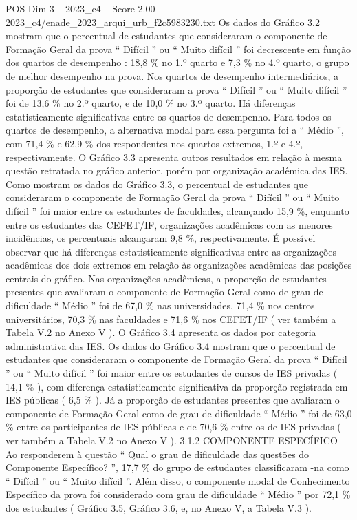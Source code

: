 \begin{textsample}{POS Dim 3 – 2023\_c4 – Score 2.00 – 2023\_c4/enade\_2023\_arqui\_urb\_f2c5983230.txt}
Os dados do Gráfico 3.2 mostram que o percentual de estudantes que consideraram o componente de Formação Geral da prova “ Difícil ” ou “ Muito difícil ” foi decrescente em função dos quartos de desempenho : 18,8 \% no 1.º quarto e 7,3 \% no 4.º quarto, o grupo de melhor desempenho na prova.
Nos quartos de desempenho intermediários, a proporção de estudantes que consideraram a prova “ Difícil ” ou “ Muito difícil ” foi de 13,6 \% no 2.º quarto, e de 10,0 \% no 3.º quarto.
Há diferenças estatisticamente significativas entre os quartos de desempenho.
Para todos os quartos de desempenho, a alternativa modal para essa pergunta foi a “ Médio ”, com 71,4 \% e 62,9 \% dos respondentes nos quartos extremos, 1.º e 4.º, respectivamente.
O Gráfico 3.3 apresenta outros resultados em relação à mesma questão retratada no gráfico anterior, porém por organização acadêmica das IES.
Como mostram os dados do Gráfico 3.3, o percentual de estudantes que consideraram o componente de Formação Geral da prova “ Difícil ” ou “ Muito difícil ” foi maior entre os estudantes de faculdades, alcançando 15,9 \%, enquanto entre os estudantes das CEFET/IF, organizações acadêmicas com as menores incidências, os percentuais alcançaram 9,8 \%, respectivamente.
É possível observar que há diferenças estatisticamente significativas entre as organizações acadêmicas dos dois extremos em relação às organizações acadêmicas das posições centrais do gráfico.
Nas organizações acadêmicas, a proporção de estudantes presentes que avaliaram o componente de Formação Geral como de grau de dificuldade “ Médio ” foi de 67,0 \% nas universidades, 71,4 \% nos centros universitários, 70,3 \% nas faculdades e 71,6 \% nos CEFET/IF ( ver também a Tabela V.2 no Anexo V ).
O Gráfico 3.4 apresenta os dados por categoria administrativa das IES.
Os dados do Gráfico 3.4 mostram que o percentual de estudantes que consideraram o componente de Formação Geral da prova “ Difícil ” ou “ Muito difícil ” foi maior entre os estudantes de cursos de IES privadas ( 14,1 \% ), com diferença estatisticamente significativa da proporção registrada em IES públicas ( 6,5 \% ).
Já a proporção de estudantes presentes que avaliaram o componente de Formação Geral como de grau de dificuldade “ Médio ” foi de 63,0 \% entre os participantes de IES públicas e de 70,6 \% entre os de IES privadas ( ver também a Tabela V.2 no Anexo V ). 3.1.2 COMPONENTE ESPECÍFICO Ao responderem à questão “ Qual o grau de dificuldade das questões do Componente Específico? ”, 17,7 \% do grupo de estudantes classificaram -na como “ Difícil ” ou “ Muito difícil ”.
Além disso, o componente modal de Conhecimento Específico da prova foi considerado com grau de dificuldade “ Médio ” por 72,1 \% dos estudantes ( Gráfico 3.5, Gráfico 3.6, e, no Anexo V, a Tabela V.3 ).

\end{textsample}
